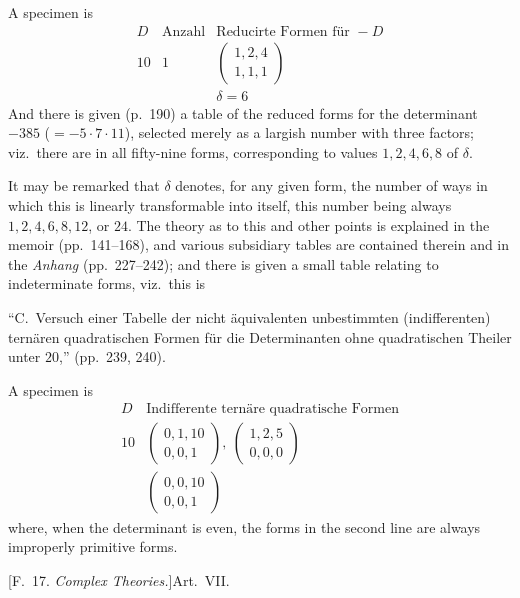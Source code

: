 \documentclass[11pt,a4paper]{article}
\begin{document}
A specimen is
\[
\begin{array}{c|c|l}
D & \text{Anzahl} & \text{Reducirte Formen f\"ur }-D \\
\hline
10 & 1 & \left(\begin{array}{c}1, 2, 4 \\ 1, 1, 1\end{array}\right) \\
 & & \delta = 6
\end{array}
\]
And there is given (p.~190) a table of the reduced forms for the determinant $-385$ ($= -5 \cdot 7 \cdot 11$), selected merely as a largish number with three factors; viz.\ there are in all fifty-nine forms, corresponding to values $1, 2, 4, 6, 8$ of $\delta$.

It may be remarked that $\delta$ denotes, for any given form, the number of ways in which this is linearly transformable into itself, this number being always $1, 2, 4, 6, 8, 12$, or $24$. The theory as to this and other points is explained in the memoir (pp.~141--168), and various subsidiary tables are contained therein and in the \textit{Anhang} (pp.~227--242); and there is given a small table relating to indeterminate forms, viz.\ this is

``C.~Versuch einer Tabelle der nicht \"aquivalenten unbestimmten (indifferenten) tern\"aren quadratischen Formen f\"ur die Determinanten ohne quadratischen Theiler unter $20$,'' (pp.~239, 240).

A specimen is
\[
\begin{array}{c|l}
D & \text{Indifferente tern\"are quadratische Formen} \\
\hline
10 & \left(\begin{array}{c}0, 1, 10 \\ 0, 0, 1\end{array}\right),\ \left(\begin{array}{c}1, 2, 5 \\ 0, 0, 0\end{array}\right) \\
 & \left(\begin{array}{c}0, 0, 10 \\ 0, 0, 1\end{array}\right)
\end{array}
\]
where, when the determinant is even, the forms in the second line are always improperly primitive forms.

\bigskip
\begin{center}
[F.~17. \textit{Complex Theories.}]\quad Art.~VII.
\end{center}
\end{document}
